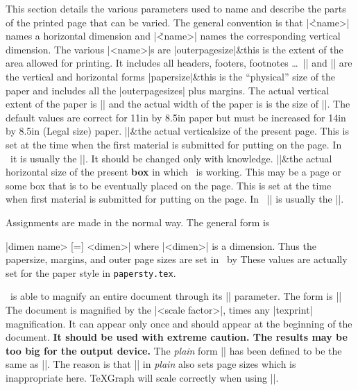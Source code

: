 This  section details the various parameters used to
name and describe the parts of the printed page that can be varied.
The general convention is that |\h<name>| names a horizontal dimension
and |\v<name>| names the corresponding vertical dimension. The various 
|<name>|s are
\bshortcomlist
|outerpagesize|&{this is the extent of the area allowed
                                    for printing. It includes all headers,
                                    footers, footnotes \dots\
                                    \@|\vouterpagesize| and \@|\houterpagesize|
                                    are the vertical and horizontal 
                                    forms}\cr
|papersize|&{this is the ``physical'' size of the paper and includes all 
                                   the |outerpagesizes| plus 
                                   margins. The actual 
                                   vertical extent of the paper 
                                   is  \@|\vpapersize| and
                                   the actual width of the 
                                    paper is is the size of \@|\hpapersize|.
The default values are correct for 
11in by 8.5in paper but must be increased for 
14in by 8.5in (Legal size) paper.}\cr
\@|\vsize|&the actual verticalsize of the present page. This is set at the time when the
first material is submitted for putting on the page. In \intex\ it is usually
the |\vcolumnsize|. It should be changed only with knowledge.\cr
\@|\hsize|&the actual horizontal size of the present {\bf box} in which \tex\ is
working. This may be a page or some box that is to be eventually placed on
the page. 
This is set at the time when 
first material is submitted for putting on the page. In \intex\ |\hsize|  is
usually 
the |\hcolumnsize|. \cr

\eshortcomlist

Assignments are made in the normal way. The general form is

\@|\<dimen name> [=] <dimen>|
\noindent
where |<dimen>| is a dimension. Thus the papersize, margins, 
and outer page sizes are set in \intex\ by 
\begintt
\documentstyle{\vpapersize = 11in
               \hpapersize = 8.5in
               \vouterpagesize=9in 
               \houterpagesize=6.5in
               \leftmarginsize=1.25in
               \topmarginsize=1in}
\endtt
These values are actually set for the paper style in {\tt papersty.tex}. 

\tex\ is able to magnify an entire document through its
|\magnification| parameter. The form is
\beginblockmode
\mbr
\pri\@||
\nbr
The document is magnified by the |<scale factor>|, times any  |texprint|
magnification. It can appear only once and should appear at the beginning of
the document. {\bf It should be used with extreme caution. The results may 
be too big for the output device.} The {\it plain} form |\magnification| has
been defined to be the same as |\mag|. The reason is that |\magnification| in
{\it plain} also sets page sizes which is inappropriate here. \TeX Graph will
scale correctly when using |\mag|. 

